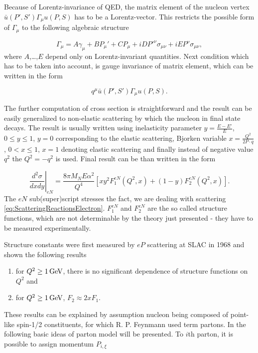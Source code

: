 Because of Lorentz-invariance of QED, the matrix element of the nucleon vertex
$\bar{u}(P',S')\Gamma_\mu u(P,S)$ has to be a Lorentz-vector. This restricts
the possible form of $\Gamma_\mu$ to the following algebraic structure

\begin{equation}
  \Gamma_\mu = A \gamma_\mu + B P_\mu' + C P_\mu + i D P'^\nu \sigma_{\mu\nu}
    + i E P^\nu \sigma_{\mu\nu},
  \label{eq:ScatteringAlgebraicMatrix}
\end{equation}
where $A$,\dots,$E$ depend only on Lorentz-invariant quantities. Next condition
which has to be taken into account, is gauge invariance of matrix element, which
can be written in the form

\begin{equation}
  q^\mu \bar{u}(P',S')\Gamma_\mu u(P,S).
  \label{eq:ScatteringGaugeInvariance}
\end{equation}

The further computation of cross section is straightforward and the result can
be easily generalized to non-elastic scattering by which the nucleon in final
state decays. The result is usually written using inelasticity parameter
$y=\frac{E-E'}{E}$, $0 \leq y \leq 1$, $y=0$ corresponding to the elastic
scattering, Bjorken variable $ x = \frac{Q^2}{2 P \cdot q}$, $ 0 < x \leq 1$, $x
= 1$ denoting elastic scattering and finally instead of negative value $q^2$ the
$Q^2 = -q^2$ is used. Final result can be than written in the form

\begin{equation}
  \left. \frac{d^2\sigma}{dxdy} \right|_{eN} =
  \frac{8 \pi M_N E \alpha^2}{Q^4} \left[ x y^2 F_1^{eN}(Q^2, x)
  + (1-y) F_2^{eN}(Q^2,x) \right].
  \label{eq:ScatteringRes1}
\end{equation}
The $eN$ sub(super)script stresses the fact, we are dealing with scattering
\eqref{eq:ScatteringReactionsElectron}. $F_1^{eN}$ and $F_2^{eN}$ are the so
called structure functions, which are not determinable by the theory just
presented - they have to be measured experimentally.

Structure constants were first measured by $eP$ scattering at SLAC in 1968
\cite{ePScattering} and shown the following results
\begin{enumerate}
  \item for $Q^2 \geq 1\,\text{GeV}$, there is no significant dependence of structure
    functions on $Q^2$ and
  \item for $Q^2 \geq 1\,\text{GeV}$, $F_2 \approx 2xF_1$.
\end{enumerate}
These results can be explained by assumption nucleon being composed of
point-like spin-1/2 constituents, for which R. P. Feynmann used term partons. In
the following basic ideas of parton model will be presented. To $i$th parton, it
is possible to assign momentum $P_{i,\xi}$

